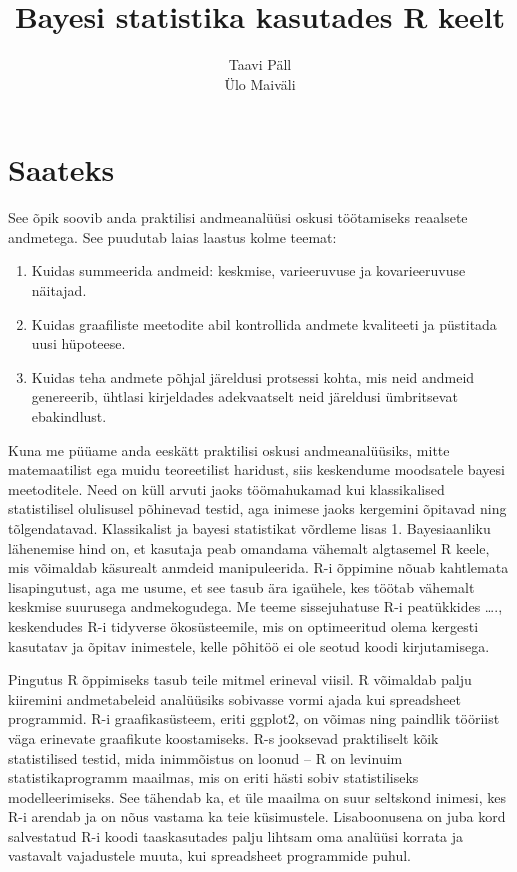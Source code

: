 \documentclass[]{book}
\title{Bayesi statistika kasutades R keelt}
\author{Taavi Päll \\ Ülo Maiväli}
\date{}
\begin{document}
\maketitle

{
\setcounter{tocdepth}{1}
\tableofcontents
}
\hypertarget{saateks}{%
\chapter*{Saateks}\label{saateks}}

See õpik soovib anda praktilisi andmeanalüüsi oskusi töötamiseks reaalsete andmetega. See puudutab laias laastus kolme teemat:

\begin{enumerate}
\def\labelenumi{\arabic{enumi}.}
\item
  Kuidas summeerida andmeid: keskmise, varieeruvuse ja kovarieeruvuse näitajad.
\item
  Kuidas graafiliste meetodite abil kontrollida andmete kvaliteeti ja püstitada uusi hüpoteese.
\item
  Kuidas teha andmete põhjal järeldusi protsessi kohta, mis neid andmeid genereerib, ühtlasi kirjeldades adekvaatselt neid järeldusi ümbritsevat ebakindlust.
\end{enumerate}

Kuna me püüame anda eeskätt praktilisi oskusi andmeanalüüsiks, mitte matemaatilist ega muidu teoreetilist haridust, siis keskendume moodsatele bayesi meetoditele. Need on küll arvuti jaoks töömahukamad kui klassikalised statistilisel olulisusel põhinevad testid, aga inimese jaoks kergemini õpitavad ning tõlgendatavad. Klassikalist ja bayesi statistikat võrdleme lisas 1. Bayesiaanliku lähenemise hind on, et kasutaja peab omandama vähemalt algtasemel R keele, mis võimaldab käsurealt anmdeid manipuleerida. R-i õppimine nõuab kahtlemata lisapingutust, aga me usume, et see tasub ära igaühele, kes töötab vähemalt keskmise suurusega andmekogudega. Me teeme sissejuhatuse R-i peatükkides \ldots{}., keskendudes R-i tidyverse ökosüsteemile, mis on optimeeritud olema kergesti kasutatav ja õpitav inimestele, kelle põhitöö ei ole seotud koodi kirjutamisega.

Pingutus R õppimiseks tasub teile mitmel erineval viisil. R võimaldab palju kiiremini andmetabeleid analüüsiks sobivasse vormi ajada kui spreadsheet programmid. R-i graafikasüsteem, eriti ggplot2, on võimas ning paindlik tööriist väga erinevate graafikute koostamiseks. R-s jooksevad praktiliselt kõik statistilised testid, mida inimmõistus on loonud -- R on levinuim statistikaprogramm maailmas, mis on eriti hästi sobiv statistiliseks modelleerimiseks. See tähendab ka, et üle maailma on suur seltskond inimesi, kes R-i arendab ja on nõus vastama ka teie küsimustele. Lisaboonusena on juba kord salvestatud R-i koodi taaskasutades palju lihtsam oma analüüsi korrata ja vastavalt vajadustele muuta, kui spreadsheet programmide puhul.
\end{document}
